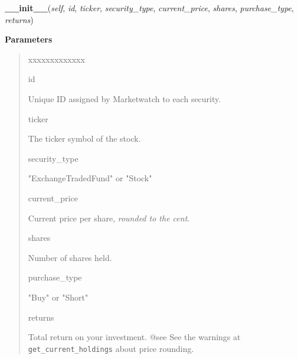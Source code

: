 \hspace{.8\funcindent}\begin{boxedminipage}{\funcwidth}

    \raggedright \textbf{\_\_init\_\_}(\textit{self}, \textit{id}, \textit{ticker}, \textit{security\_type}, \textit{current\_price}, \textit{shares}, \textit{purchase\_type}, \textit{returns})

\setlength{\parskip}{2ex}
\setlength{\parskip}{1ex}
      \textbf{Parameters}
      \vspace{-1ex}

      \begin{quote}
        \begin{Ventry}{xxxxxxxxxxxxx}

          \item[id]

          Unique ID assigned by Marketwatch to each security.

          \item[ticker]

          The ticker symbol of the stock.

          \item[security\_type]

          "ExchangeTradedFund" or "Stock"

          \item[current\_price]

          Current price per share, \textit{rounded to the cent}.

          \item[shares]

          Number of shares held.

          \item[purchase\_type]

          "Buy" or "Short"

          \item[returns]

          Total return on your investment. @see See the warnings at 
          \texttt{get\_current\_holdings} about price rounding.

        \end{Ventry}

      \end{quote}

    \end{boxedminipage}


